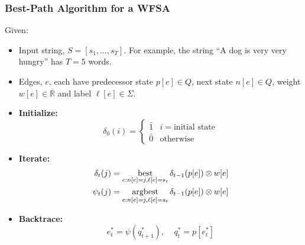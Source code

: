 \documentclass{beamer}
\newcommand{\best}{\operatornamewithlimits{best}}
\newcommand{\argbest}{\operatornamewithlimits{argbest}}
\begin{document}
\begin{frame}
  \frametitle{Best-Path Algorithm for a WFSA}

  Given:
  \begin{itemize}
  \item Input string, $S=[s_1,\ldots,s_T]$.  For example, the
    string ``A dog is very very hungry'' has $T=5$ words.
  \item Edges, $e$, each have predecessor state $p[e]\in Q$, next state
    $n[e]\in Q$, weight $w[e]\in\overline{\mathbb{R}}$ and label $\ell[e]\in\Sigma$.
  \end{itemize}
  \begin{itemize}
  \item {\bf Initialize:}
    \begin{displaymath}
      \delta_0(i) = \begin{cases}
        \bar{1} & i=\mbox{initial state}\\
        \bar{0} & \mbox{otherwise}
      \end{cases}
    \end{displaymath}
  \item {\bf Iterate:}
    \begin{align*}
      \delta_t(j) &= \best_{e:n[e]=j,\ell[e]=s_t} \delta_{t-1}(p[e]) \otimes w[e]\\
      \psi_t(j) &= \argbest_{e:n[e]=j,\ell[e]=s_t} \delta_{t-1}(p[e]) \otimes w[e]
    \end{align*}
  \item {\bf Backtrace:}
    \begin{displaymath}
      e^*_t = \psi(q^*_{t+1}),~~~~~q^*_t=p[e^*_t]
    \end{displaymath}
  \end{itemize}
\end{frame}
    
\end{document}
